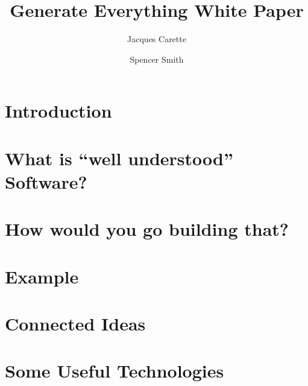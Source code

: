 \documentclass[10pt,twoside,onecolumn,openany,letterpaper]{memoir}
\begin{document}
\title{Generate Everything White Paper}
\author{Jacques Carette \and Spencer Smith}



\maketitle

\chapter{Introduction}

\chapter{What is ``well understood'' Software?}
\chapter{How would you go building that?}
\chapter{Example}
\chapter{Connected Ideas}
\chapter{Some Useful Technologies}
\end{document}
